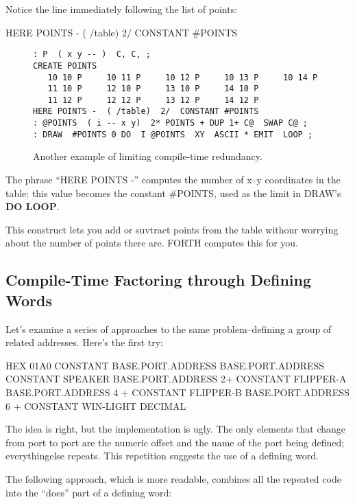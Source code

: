 Notice the line immediately following the list of points:

\begin{Code}
HERE POINTS -  ( /table)  2/  CONSTANT #POINTS
\end{Code}
\begin{figure*}[tttt]
\caption{Another example of limiting compile-time redundancy.}
\begin{center}
\begin{BVerbatim}
: P  ( x y -- )  C, C, ;
CREATE POINTS
   10 10 P     10 11 P     10 12 P     10 13 P     10 14 P
   11 10 P     12 10 P     13 10 P     14 10 P
   11 12 P     12 12 P     13 12 P     14 12 P
HERE POINTS -  ( /table)  2/  CONSTANT #POINTS
: @POINTS  ( i -- x y)  2* POINTS + DUP 1+ C@  SWAP C@ ;
: DRAW  #POINTS 0 DO  I @POINTS  XY  ASCII * EMIT  LOOP ;
\end{BVerbatim}
\end{center}
\end{figure*}
The phrase ``HERE POINTS -'' computes the number of x--y coordinates in the table: this value becomes the constant \#POINTS, used as the limit in DRAW's \textbf{DO LOOP}.

This construct lets you add or suvtract points from the table withour worrying about the number of points there are. FORTH computes this for you.

\subsection{{Compile-Time Factoring through Defining Words}}
Let's examine a series of approaches to the same problem--defining a
group of related addresses. Here's the first try:

\begin{Code}
HEX 01A0 CONSTANT BASE.PORT.ADDRESS
BASE.PORT.ADDRESS CONSTANT SPEAKER
BASE.PORT.ADDRESS 2+ CONSTANT FLIPPER-A
BASE.PORT.ADDRESS 4 + CONSTANT FLIPPER-B
BASE.PORT.ADDRESS 6 + CONSTANT WIN-LIGHT
DECIMAL
\end{Code}
The idea is right, but the implementation is ugly. The only elements that change from port to port are the numeric offset and the name of the port being defined; everythingelse repeats. This repetition suggests the use of a defining word.

The following approach, which is more readable, combines all the repeated code into the ``does'' part  of a defining word:

